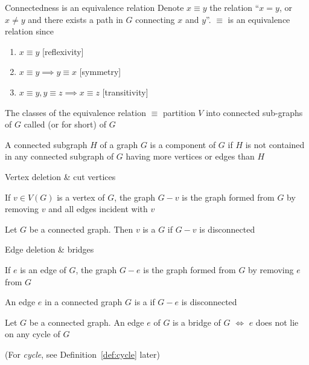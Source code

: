 \documentclass[aspectratio=43]{beamer}
\begin{document}
\begin{frame}{Connectedness is an equivalence relation}
	Denote $x\equiv y$ the relation  ``$x=y$, or $x\neq y$ and there exists a path in $G$ connecting $x$ and $y$''. $\equiv$ is an equivalence relation since
	\begin{enumerate}
		\item $x\equiv y$ \hfill[reflexivity]
		\item $x\equiv y\implies y\equiv x$ \hfill[symmetry]
		\item $x\equiv y, y\equiv z\implies x\equiv z$ \hfill[transitivity]
	\end{enumerate}
	\vfill
	\begin{definition}
		The classes of the equivalence relation $\equiv$ partition $V$ into connected sub-graphs of $G$ called  (or  for short) of $G$
	\end{definition}
	\vfill
	A connected subgraph $H$ of a graph $G$ is a component of $G$ if $H$ is not contained in any connected subgraph of $G$ having more vertices or edges than $H$
\end{frame}



\begin{frame}{Vertex deletion \& cut vertices}
\begin{definition}
If $v\in V(G)$ is a vertex of $G$, the graph $G-v$ is the graph formed from $G$ by removing $v$ and all edges incident with $v$
\end{definition}
\vfill
\begin{definition}
	Let $G$ be a connected graph. Then $v$ is a  $G$ if $G-v$ is disconnected
\end{definition}
\end{frame}


\begin{frame}{Edge deletion \& bridges}
\begin{definition}
	If $e$ is an edge of $G$, the graph $G-e$ is the graph formed from $G$ by removing $e$ from $G$
\end{definition}
\vfill
\begin{definition}[{Bridge}]
An edge $e$ in a connected graph $G$ is a  if $G-e$ is disconnected
\end{definition}
\vfill
\begin{theorem}
Let $G$ be a connected graph. An edge $e$ of $G$ is a bridge of $G$ $\iff$ $e$ does not lie on any cycle of $G$
\end{theorem}
(For \emph{cycle}, see Definition~\ref{def:cycle} later)
\end{frame}
\end{document}
